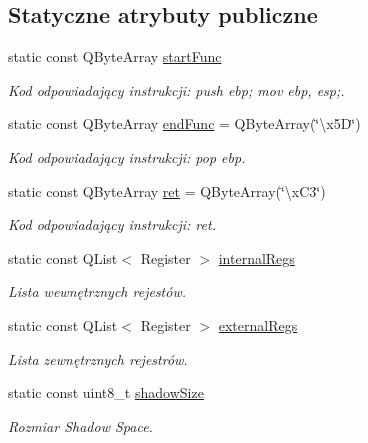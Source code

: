 \subsection*{Statyczne atrybuty publiczne}
\begin{DoxyCompactItemize}
\item 
static const Q\-Byte\-Array \hyperlink{class_code_defines_ab0339e357461e07258de4e77d0c73c5c}{start\-Func}
\begin{DoxyCompactList}\small\item\em Kod odpowiadający instrukcji\-: push ebp; mov ebp, esp;. \end{DoxyCompactList}\item 
static const Q\-Byte\-Array \hyperlink{class_code_defines_abb945f5e809b498405e0a91901c784e1}{end\-Func} = Q\-Byte\-Array(\char`\"{}\textbackslash{}x5\-D\char`\"{})
\begin{DoxyCompactList}\small\item\em Kod odpowiadający instrukcji\-: pop ebp. \end{DoxyCompactList}\item 
static const Q\-Byte\-Array \hyperlink{class_code_defines_ae8c1690d0a6fe53c81dea4c8cad6ca5c}{ret} = Q\-Byte\-Array(\char`\"{}\textbackslash{}x\-C3\char`\"{})
\begin{DoxyCompactList}\small\item\em Kod odpowiadający instrukcji\-: ret. \end{DoxyCompactList}\item 
static const Q\-List$<$ Register $>$ \hyperlink{class_code_defines_a71b60a174fc6190178fee7c552f52732}{internal\-Regs}
\begin{DoxyCompactList}\small\item\em Lista wewnętrznych rejestów. \end{DoxyCompactList}\item 
static const Q\-List$<$ Register $>$ \hyperlink{class_code_defines_a045622ec64ec17b4b8a2d55b854117c7}{external\-Regs}
\begin{DoxyCompactList}\small\item\em Lista zewnętrznych rejestrów. \end{DoxyCompactList}\item 
static const uint8\-\_\-t \hyperlink{class_code_defines_a89139a3f358c98200f78478fd0dd3bd9}{shadow\-Size}
\begin{DoxyCompactList}\small\item\em Rozmiar Shadow Space. \end{DoxyCompactList}\item 

\end{DoxyCompactItemize}
